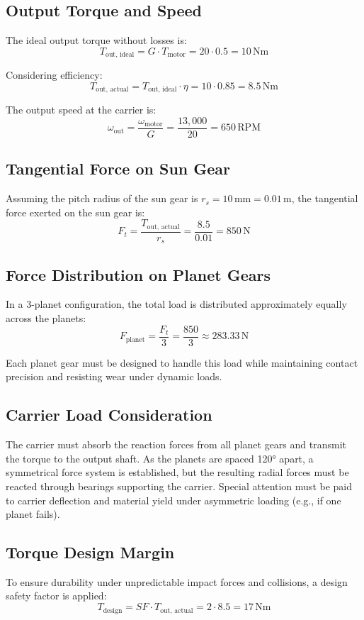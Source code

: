 \documentclass[a4paper,12pt]{article}
\begin{document}
\subsection*{Output Torque and Speed}
The ideal output torque without losses is:
\[
T_{\text{out, ideal}} = G \cdot T_{\text{motor}} = 20 \cdot 0.5 = 10 \, \text{Nm}
\]

Considering efficiency:
\[
T_{\text{out, actual}} = T_{\text{out, ideal}} \cdot \eta = 10 \cdot 0.85 = 8.5 \, \text{Nm}
\]

The output speed at the carrier is:
\[
\omega_{\text{out}} = \frac{\omega_{\text{motor}}}{G} = \frac{13{,}000}{20} = 650 \, \text{RPM}
\]

\subsection*{Tangential Force on Sun Gear}
Assuming the pitch radius of the sun gear is \( r_s = 10 \, \text{mm} = 0.01 \, \text{m} \), the tangential force exerted on the sun gear is:
\[
F_t = \frac{T_{\text{out, actual}}}{r_s} = \frac{8.5}{0.01} = 850 \, \text{N}
\]

\subsection*{Force Distribution on Planet Gears}
In a 3-planet configuration, the total load is distributed approximately equally across the planets:
\[
F_{\text{planet}} = \frac{F_t}{3} = \frac{850}{3} \approx 283.33 \, \text{N}
\]

Each planet gear must be designed to handle this load while maintaining contact precision and resisting wear under dynamic loads.

\subsection*{Carrier Load Consideration}
The carrier must absorb the reaction forces from all planet gears and transmit the torque to the output shaft. As the planets are spaced 120° apart, a symmetrical force system is established, but the resulting radial forces must be reacted through bearings supporting the carrier. Special attention must be paid to carrier deflection and material yield under asymmetric loading (e.g., if one planet fails).

\subsection*{Torque Design Margin}
To ensure durability under unpredictable impact forces and collisions, a design safety factor is applied:
\[
T_{\text{design}} = SF \cdot T_{\text{out, actual}} = 2 \cdot 8.5 = 17 \, \text{Nm}
\]
\end{document}
